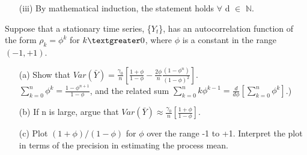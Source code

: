 \begin{itemize}
\begin{itemize}
   \item[(iii)] By mathematical induction, the statement holds $\forall$ d $\in$ $\mathbb{N}$.
  \end{itemize}
  \end{itemize}
  
\begin{ex}\label{ex:example_ts1}
Suppose that a stationary time series, \{$Y_t$\}, has an autocorrelation function of the form $\rho_k=\phi^k$ for $k \textgreater 0$, where $\phi$ is a constant in the range $(-1,+1)$.
  \begin{itemize}
  \item[(a)] Show that $Var(\bar{Y})=\frac{\gamma_0}{n}[\frac{1+\phi}{1-\phi}-\frac{2\phi}{n}\frac{(1-\phi^n)}{(1-\phi)^{2}}]$.\\
  $\sum_{k=0}^{n}\phi^k=\frac{1-\phi^{n+1}}{1-\phi}$, and the related sum $\sum_{k=0}^{n}k\phi^{k-1}=\frac{d}{d\phi}[\sum_{k=0}^{n}\phi^k]$.)
  \item[(b)] If n is large, argue that $Var(\bar{Y}) \approx \frac{\gamma_0}{n}[\frac{1+\phi}{1-\phi}]$.
  \item[(c)] Plot $(1+\phi)/(1-\phi)$ for $\phi$ over the range -1 to +1. Interpret the plot in terms of the precision in estimating the process mean.
  \end{itemize}
\end{ex}  
  
